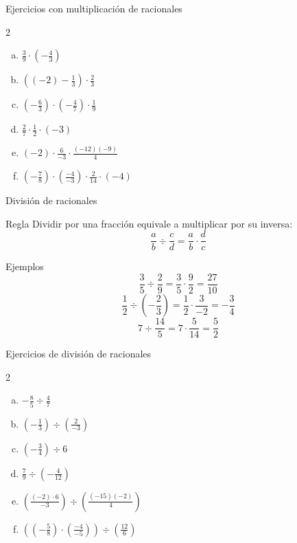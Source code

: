 \documentclass[aspectratio=169,10pt]{beamer}
\begin{document}
	\begin{frame}{Ejercicios con multiplicación de racionales}
		\begin{multicols}{2}
			\begin{enumerate}[a)]
				\item \(\frac39\cdot\left(-\frac43\right)\)
				\item \(\left((-2)-\frac13\right)\cdot\frac23\)
				\item \(\left(-\frac63\right)\cdot\left(-\frac47\right)\cdot\frac19\)
				\item \(\frac27\cdot\frac12\cdot(-3)\)
				\item \((-2)\cdot\frac6{-3}\cdot\frac{(-12)(-9)}4\)
				\item \(\left(-\frac78\right)\cdot\left(\frac{-4}{-3}\right)\cdot\frac{2}{14}\cdot(-4)\)
			\end{enumerate}
		\end{multicols}
	\end{frame}
	
	\begin{frame}{División de racionales}
		\begin{block}{Regla}
			Dividir por una fracción equivale a multiplicar por su inversa:
			\[
			\frac{a}{b}\div\frac{c}{d}=\frac{a}{b}\cdot\frac{d}{c}
			\]
		\end{block}
		
		\begin{exampleblock}{Ejemplos}
			\[
			\frac35\div\frac29=\frac35\cdot\frac92=\frac{27}{10}
			\]
			\[
			\frac12\div\left(-\frac23\right)=\frac12\cdot\frac3{-2}=-\frac34
			\]
			\[
			7\div\frac{14}{5}=7\cdot\frac5{14}=\frac52
			\]
		\end{exampleblock}
	\end{frame}
	
	\begin{frame}{Ejercicios de división de racionales}
		\begin{multicols}{2}
			\begin{enumerate}[a)]
				\item \(-\frac85\div\frac47\)
				\item \(\left(-\frac13\right)\div\left(\frac2{-3}\right)\)
				\item \(\left(-\frac34\right)\div 6\)
				\item \(\frac79\div\left(-\frac4{12}\right)\)
				\item \(\left(\frac{(-2)\cdot 6}{-3}\right)\div\left(\frac{(-15)(-2)}4\right)\)
				\item \(\left(\left(-\frac58\right)\cdot\left(\frac{-4}{-5}\right)\right)\div\left(\frac{12}{6}\right)\)
			\end{enumerate}
		\end{multicols}
	\end{frame}
	
\end{document}
